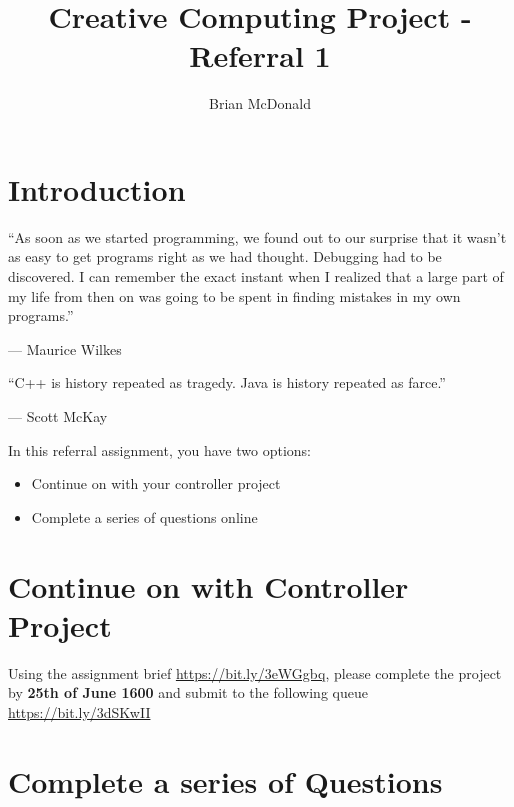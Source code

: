 \documentclass{../../../fal_assignment}
\title{Creative Computing Project - Referral 1}
\author{Brian McDonald}
\begin{document}
	
	\maketitle
	
	\section*{Introduction}
	
	\begin{marginquote}
		``As soon as we started programming, we found out to our surprise that it wasn't as easy to get programs right as we had thought. Debugging had to be discovered. I can remember the exact instant when I realized that a large part of my life from then on was going to be spent in finding mistakes in my own programs.''
		\par --- Maurice Wilkes
		\marginquoterule
		\par ``C++ is history repeated as tragedy. Java is history repeated as farce.''
		\par --- Scott McKay
	\end{marginquote}
	
	In this referral assignment, you have two options:
	
	\begin{itemize}
		\item Continue on with your controller project
		\item Complete a series of questions online 
	\end{itemize}

	\section*{Continue on with Controller Project}
	
	Using the assignment brief \url{https://bit.ly/3eWGgbq}, please complete the project by \textbf{25th of June 1600} and submit to the following queue \url{https://bit.ly/3dSKwII}
	
	\section*{Complete a series of Questions}
	
\end{document}
